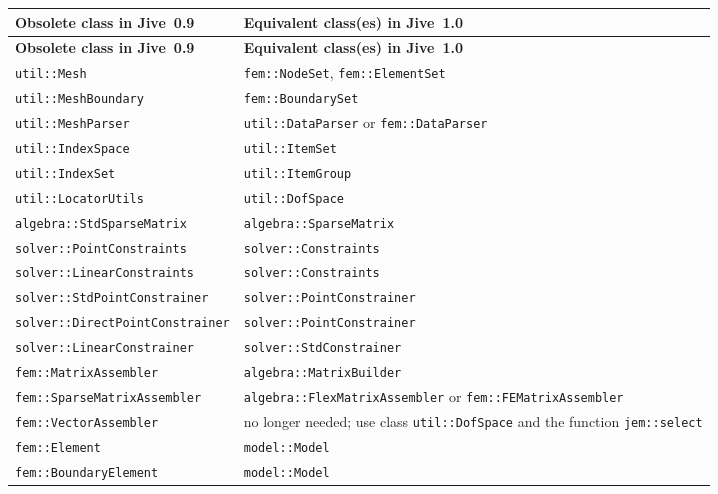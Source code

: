 \documentclass[a4paper,11pt]{article}
\newcommand{\Code}[1]{\texttt{#1}}
\newcommand{\PBS}[1]{\let\temp=\\#1\let\\=\temp}
\begin{document}
\renewcommand{\arraystretch}{1.4}

\setlongtables

\vspace{4ex}

\begin{longtable}[c]{|p{7cm}|>{\PBS\raggedright}p{7cm}|}
  \hline
  \textbf{Obsolete class in Jive~0.9} &
  \textbf{Equivalent class(es) in Jive~1.0} \\
  \hline
  \endhead
  \hline
  \textbf{Obsolete class in Jive~0.9} &
  \textbf{Equivalent class(es) in Jive~1.0} \\
  \hline \hline
  \endfirsthead
  \endfoot
  \hline
  \endlastfoot
  \Code{util::Mesh} &
  \Code{fem::NodeSet}, \Code{fem::ElementSet} \\
  \hline
  \Code{util::Mesh\-Boundary} &
  \Code{fem::BoundarySet} \\
  \hline
  \Code{util::Mesh\-Parser} &
  \Code{util::DataParser} or \Code{fem::DataParser} \\
  \hline
  \Code{util::Index\-Space} &
  \Code{util::ItemSet} \\
  \hline
  \Code{util::IndexSet} &
  \Code{util::ItemGroup} \\
  \hline
  \Code{util::Locator\-Utils} &
  \Code{util::DofSpace} \\
  \hline \hline
  \Code{algebra::StdSparse\-Matrix} &
  \Code{algebra::Sparse\-Matrix} \\
  \hline \hline
  \Code{solver::Point\-Constraints} &
  \Code{solver::Constraints} \\
  \hline
  \Code{solver::Linear\-Constraints} &
  \Code{solver::Constraints} \\
  \hline
  \Code{solver::StdPoint\-Constrainer} &
  \Code{solver::Point\-Constrainer} \\
  \hline
  \Code{solver::Direct\-Point\-Constrainer} &
  \Code{solver::Point\-Constrainer} \\
  \hline
  \Code{solver::Linear\-Constrainer} &
  \Code{solver::StdConstrainer} \\
  \hline \hline
  \Code{fem::Matrix\-Assembler} &
  \Code{algebra::Matrix\-Builder} \\
  \hline
  \Code{fem::Sparse\-Matrix\-Assembler} &
  \Code{algebra::Flex\-Matrix\-Assembler} or
  \Code{fem::FEMatrix\-Assembler} \\
  \hline
  \Code{fem::Vector\-Assembler} &
  no longer needed; use class \Code{util::DofSpace} and the function
  \Code{jem::select} \\
  \hline
  \Code{fem::Element} &
  \Code{model::Model} \\
  \hline
  \Code{fem::Boundary\-Element} &
  \Code{model::Model} \\
\end{longtable}
\end{document}
